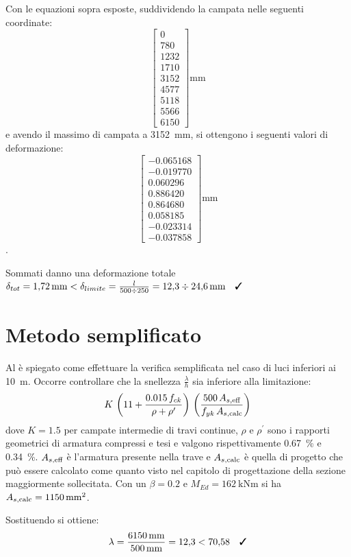 Con le equazioni sopra esposte, suddividendo la campata nelle seguenti coordinate: 
\[
    \begin{bmatrix}
        0\\  780\\ 1232\\ 1710\\ 3152\\ 4577\\ 5118\\ 5566\\ 6150
    \end{bmatrix}    
    \si{\milli\metre}
\] 
e avendo il massimo di campata a \SI{3152}{\milli\metre}, si ottengono i seguenti valori di deformazione:
\[
    \begin{bmatrix}
        -0.065168\\ -0.019770\\ 0.060296\\ 0.886420\\ 0.864680\\ 0.058185\\ -0.023314\\ -0.037858
    \end{bmatrix}    
    \si{\milli\metre}
\].

Sommati danno una deformazione totale $\delta_{tot} = \SI{1.72}{\milli\metre} <\delta_{limite} = \frac{l}{500\div 250} = \num{12.3} \div \SI{24.6}{\milli\metre} \quad\checked$ 

\section{Metodo semplificato}
Al  è spiegato come effettuare la verifica semplificata nel caso di luci inferiori ai \SI{10}{\metre}.
Occorre controllare che la snellezza $\frac{\lambda}{h}$ sia inferiore alla limitazione:
\begin{equation}
    K  \, \left( 11 + \frac{0.015\,f_{ck}}{\rho + \rho^\prime}\right) \, \left( \frac{500 \, A_{s, \textup{eff}}}{f_{yk} \, A_{s, \textup{calc}}} \right)
\end{equation}
dove $K = 1.5$ per campate intermedie di travi continue, $\rho$ e $\rho^\prime$ sono i rapporti geometrici di armatura compressi e tesi e valgono rispettivamente \SI{0.67}{\percent} e \SI{0.34}{\percent}.
$A_{s, \textup{eff}}$ è l'armatura presente nella trave e $A_{s, \textup{calc}}$ è quella di progetto che può essere calcolato come quanto visto nel capitolo di progettazione della sezione maggiormente sollecitata. 
Con un $\beta = 0.2$ e $M_{Ed} = \SI{162}{\kilo\newton\metre}$ si ha $A_{s, \textup{calc}} = \SI{1150}{\milli\metre\squared}$.

Sostituendo si ottiene:
\[
    \lambda = \frac{\SI{6150}{\milli\metre}}{\SI{500}{\milli\metre}} = \num{12.3} < \num{70.58} \quad \checked
\]